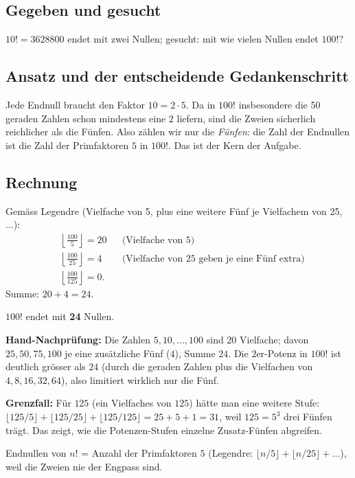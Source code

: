 

\subsection*{Gegeben und gesucht}
$10!=3628800$ endet mit zwei Nullen; gesucht: mit wie vielen Nullen endet
$100!$?

\subsection*{Ansatz und der entscheidende Gedankenschritt}
Jede Endnull braucht den Faktor $10=2\cdot5$. Da in $100!$ insbesondere
die 50 geraden Zahlen schon mindestens eine $2$ liefern, sind die Zweien
sicherlich reichlicher als die Fünfen.  Also z\"ahlen wir nur die
\emph{Fünfen}: die Zahl der Endnullen ist die Zahl der Primfaktoren
$5$ in $100!$. Das ist der Kern der Aufgabe.

\subsection*{Rechnung}
Gemäss Legendre (Vielfache von 5, plus eine weitere Fünf je Vielfachem
von 25, ...):
\begin{align}
  &\left\lfloor\frac{100}{5}\right\rfloor = 20 &&\text{(Vielfache von 5)}\\
  &\left\lfloor\frac{100}{25}\right\rfloor = 4 &&\text{(Vielfache von 25 geben je eine Fünf extra)}\\
  &\left\lfloor\frac{100}{125}\right\rfloor = 0 .
\end{align}
Summe: $20+4=24$.

\begin{ergebnis}
$100!$ endet mit \textbf{24} Nullen.
\end{ergebnis}

\begin{kontrolle}
\textbf{Hand-Nachprüfung:} Die Zahlen $5,10,\dots,100$ sind 20
Vielfache; davon $25,50,75,100$ je eine zusätzliche Fünf ($4$), Summe
$24$. Die $2$er-Potenz in $100!$ ist deutlich gr\"osser als $24$ (durch
die geraden Zahlen plus die Vielfachen von $4,8,16,32,64$), also
limitiert wirklich nur die Fünf.

\textbf{Grenzfall:} F\"ur $125$ (ein Vielfaches von $125$) h\"atte man
eine weitere Stufe: $\lfloor125/5\rfloor+\lfloor125/25\rfloor+
\lfloor125/125\rfloor=25+5+1=31$, weil $125=5^3$ drei Fünfen tr\"agt.
Das zeigt, wie die Potenzen-Stufen einzelne Zusatz-F\"unfen abgreifen.
\end{kontrolle}

\begin{merksatz}
Endnullen von $n!$ = Anzahl der Primfaktoren $5$ (Legendre: $\lfloor
n/5\rfloor+\lfloor n/25\rfloor+\dots$), weil die Zweien nie der Engpass
sind.
\end{merksatz}
